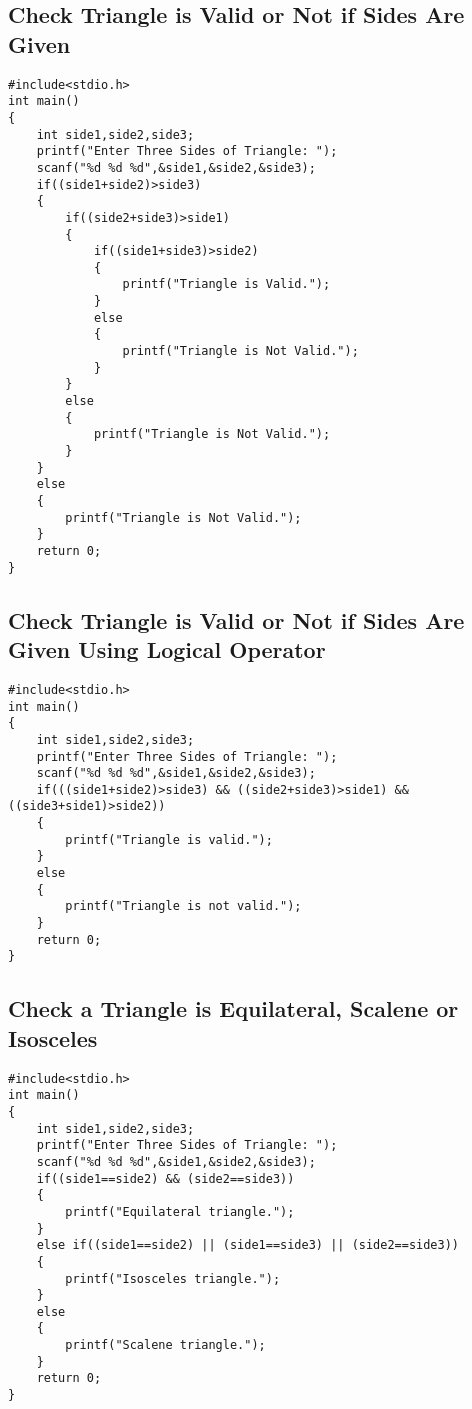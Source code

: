 \documentclass[a4paper,14pt]{article}
\begin{document}
\subsection{Check Triangle is Valid or Not if Sides Are Given}
\vspace{0.5cm}
\begin{lstlisting}[caption={Check Triangle is Valid or Not if Sides Are Given}]
#include<stdio.h>
int main()
{
    int side1,side2,side3;
    printf("Enter Three Sides of Triangle: ");
    scanf("%d %d %d",&side1,&side2,&side3);
    if((side1+side2)>side3)
    {
        if((side2+side3)>side1)
        {
            if((side1+side3)>side2)
            {
                printf("Triangle is Valid.");
            }
            else
            {
                printf("Triangle is Not Valid.");
            }
        }
        else
        {
            printf("Triangle is Not Valid.");
        }
    }
    else
    {
        printf("Triangle is Not Valid.");
    }
    return 0;
}
\end{lstlisting}
\newpage

\subsection{Check Triangle is Valid or Not if Sides Are Given Using Logical Operator}
\vspace{0.5cm}
\begin{lstlisting}[caption={Check Triangle is Valid or Not if Sides Are Given Using Logical Operator}]
#include<stdio.h>
int main()
{
    int side1,side2,side3;
    printf("Enter Three Sides of Triangle: ");
    scanf("%d %d %d",&side1,&side2,&side3);
    if(((side1+side2)>side3) && ((side2+side3)>side1) && ((side3+side1)>side2))
    {
        printf("Triangle is valid.");
    }
    else
    {
        printf("Triangle is not valid.");
    }
    return 0;
}
\end{lstlisting}
\newpage

\subsection{Check a Triangle is Equilateral, Scalene or Isosceles}
\vspace{0.5cm}
\begin{lstlisting}[caption={Check a Triangle is Equilateral, Scalene or Isosceles}]
#include<stdio.h>
int main()
{
    int side1,side2,side3;
    printf("Enter Three Sides of Triangle: ");
    scanf("%d %d %d",&side1,&side2,&side3);
    if((side1==side2) && (side2==side3)) 
    {
        printf("Equilateral triangle.");
    }
    else if((side1==side2) || (side1==side3) || (side2==side3)) 
    {
        printf("Isosceles triangle.");
    }
    else 
    {
        printf("Scalene triangle.");
    }
    return 0;
}
\end{lstlisting}
\newpage
\end{document}
